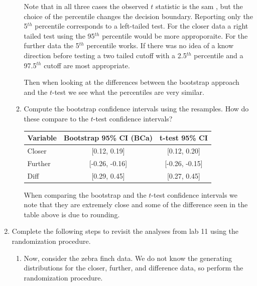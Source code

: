 \documentclass{article}\usepackage[]{graphicx}\usepackage[]{xcolor}
\begin{document}
\begin{enumerate}
\begin{enumerate}
  
  Note that in all three cases the observed $t$ statistic is the sam , but the choice of the percentile changes the decision boundary. Reporting only the 5$^{th}$ percentile corresponds to a left-tailed test. For the closer data a right tailed test using the 95$^{th}$ percentile would be more approporaite. For the further data the 5$^{th}$ percentile works. If there was no idea of a know direction before testing a two tailed cutoff with a 2.5$^{th}$ percentile and a 97.5$^{th}$ cutoff are most appropriate. 

  Then when looking at the differences between the bootstrap approach and the $t$-test we see what the percentiles are very similar.
  
  
  \item Compute the bootstrap confidence intervals using the resamples. How do these 
  compare to the $t$-test confidence intervals?
  \begin{table}[ht]
\centering
\begin{tabular}{lcc}
  \hline
 Variable & Bootstrap 95\% CI (BCa) & t-test 95\% CI\\ 
  \hline
Closer & [0.12, 0.19] & [0.12, 0.20]\\ 
 Further & [-0.26, -0.16] & [-0.26, -0.15]\\ 
 Diff & [0.29, 0.45] & [0.27, 0.45] \\ 
   \hline
\end{tabular}
\end{table}
  
  When comparing the bootstrap and the $t$-test confidence intervals we note that they are extremely close and some of the difference seen in the table above is due to rounding. 
  
\end{enumerate}

\item Complete the following steps to revisit the analyses from lab 11 using the
randomization procedure.
\begin{enumerate}
\item Now, consider the zebra finch data. We do not know the generating distributions
for the closer, further, and difference data, so perform the randomization procedure.


\end{enumerate}
\end{enumerate}
\end{document}
